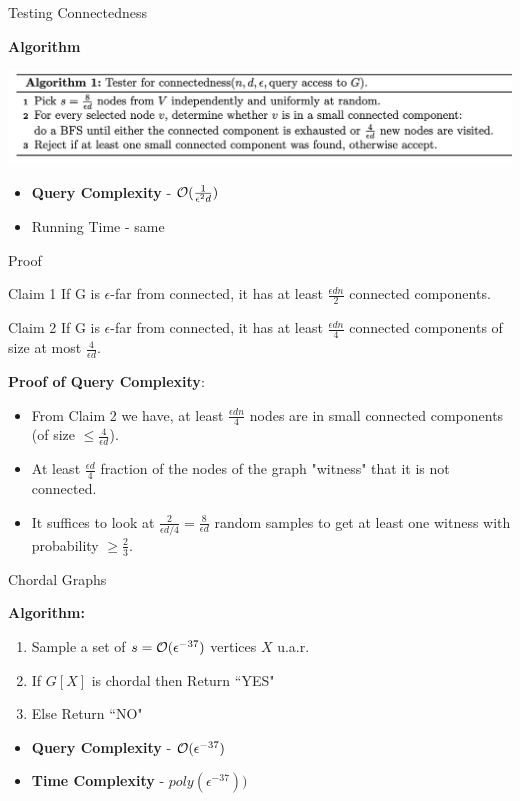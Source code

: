 \documentclass{beamer}
\begin{document}
\begin{frame}{Testing Connectedness}
	
	
	{\bf Algorithm}
	
	\includegraphics[scale=0.5]{connect-algo}
	\pause
	\begin{itemize}
		\item {\bf Query Complexity } -  ${\cal O}(\frac{1}{\epsilon ^ 2 d})$
		\item Running Time - same
		
	\end{itemize}
	
\end{frame}

\begin{frame}{Proof}
 	\begin{exampleblock}{Claim 1}
 		If G is $\epsilon$-far from connected, it has at least $\frac{\epsilon d n}{2}$ connected components.
 	\end{exampleblock}
 \pause
 	\begin{exampleblock}{Claim 2}
 		If G is $\epsilon$-far from connected, it has at least $\frac{\epsilon dn}{4}$ connected components of size at most $\frac{4}{\epsilon d}$.
 \end{exampleblock}

\pause
{\bf Proof of Query Complexity}:
\begin{itemize}
	\item From Claim 2 we have, at least $\frac{\epsilon d n}{4}$ nodes are in small connected components (of size $\le \frac{4}{\epsilon d}$). 
	\item At least $\frac{\epsilon d}{4}$ fraction of the nodes of the graph "witness" that it is not connected.
	\item It suffices to look at $\frac{2}{\epsilon d /4} = \frac{8}{\epsilon d}$ random samples to get at least one witness with probability  $\ge \frac{2}{3}$.
\end{itemize}

\end{frame}


\begin{frame}{Chordal Graphs}
	
	{\bf Algorithm:}
	\begin{enumerate}
		\item Sample a set of $s={\cal O}(\epsilon^{-37})$ vertices  $X$ u.a.r. 
		\item If $G[X]$ is chordal then Return ``YES"
		\item Else Return ``NO"
	\end{enumerate}
\pause
\vspace{1cm}
\begin{itemize}
	\item {\bf Query Complexity} - ${\cal O}(\epsilon^{-37})$
	\item {\bf Time Complexity} - $poly(\epsilon^{-37}))$
\end{itemize}
\end{frame}
\end{document}
